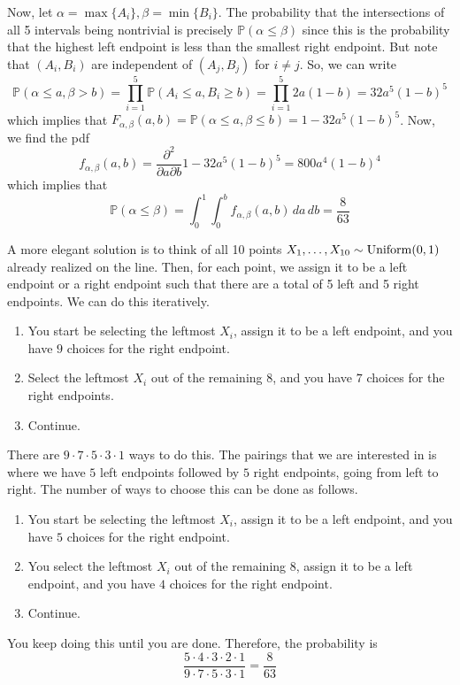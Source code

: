 \begin{solution}
		Now, let $\alpha = \max\{A_i\}, \beta = \min\{B_i\}$. The probability that the intersections of all 5 intervals being nontrivial is precisely $\mathbb{P}(\alpha \leq \beta)$ since this is the probability that the highest left endpoint is less than the smallest right endpoint. But note that $(A_i, B_i)$ are independent of $(A_j, B_j)$ for $i \neq j$. So, we can write 
		\begin{equation}
			\mathbb{P}(\alpha \leq a, \beta > b) = \prod_{i=1}^5 \mathbb{P}(A_i \leq a, B_i \geq b) = \prod_{i=1}^5 2 a (1 - b) =  32 a^5 (1 - b)^5 
		\end{equation}
		which implies that $F_{\alpha, \beta}(a, b) = \mathbb{P}(\alpha \leq a, \beta \leq b) = 1 - 32a^5 (1 - b)^5$. Now, we find the pdf
		\begin{equation}
			f_{\alpha, \beta} (a, b) = \frac{\partial^2}{\partial a \partial b} 1 - 32a^5 (1 - b)^5 = 800 a^4 (1 - b)^4
		\end{equation}
		which implies that 
		\begin{equation}
			\mathbb{P}(\alpha \leq \beta) = \int_0^1 \int_0^b f_{\alpha, \beta}(a, b) \,da \,db  = \frac{8}{63}
		\end{equation}
	\end{solution}
	\begin{solution}
		A more elegant solution is to think of all 10 points $X_1, \ldots, X_{10} \sim \operatorname{Uniform}(0, 1)$ already realized on the line. Then, for each point, we assign it to be a left endpoint or a right endpoint such that there are a total of 5 left and 5 right endpoints. We can do this iteratively. 
		\begin{enumerate}
		  \item You start be selecting the leftmost $X_i$, assign it to be a left endpoint, and you have $9$ choices for the right endpoint. 
			\item Select the leftmost $X_i$ out of the remaining $8$, and you have $7$ choices for the right endpoints. 
			\item Continue. 
		\end{enumerate}
		There are $9 \cdot 7 \cdot 5 \cdot 3 \cdot 1$ ways to do this. The pairings that we are interested in is where we have $5$ left endpoints followed by $5$ right endpoints, going from left to right. The number of ways to choose this can be done as follows. 
		\begin{enumerate}
		  \item You start be selecting the leftmost $X_i$, assign it to be a left endpoint, and you have $5$ choices for the right endpoint. 
			\item You select the leftmost $X_i$ out of the remaining $8$, assign it to be a left endpoint, and you have $4$ choices for the right endpoint. 
			\item Continue. 
		\end{enumerate}
		You keep doing this until you are done. Therefore, the probability is 
		\begin{equation}
			\frac{5 \cdot 4 \cdot 3 \cdot 2 \cdot 1}{9 \cdot 7 \cdot 5 \cdot 3 \cdot 1} = \frac{8}{63} 
		\end{equation}
	\end{solution}

